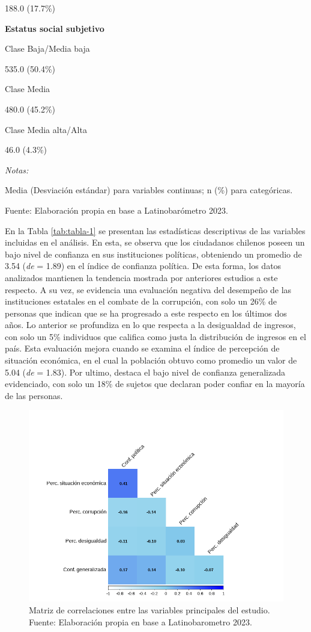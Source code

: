 \documentclass[12pt,twoside]{templates/facsothesis}
\begin{document}
188.0 (17.7\%)

\textbf{Estatus social subjetivo}

Clase Baja/Media baja

535.0 (50.4\%)

Clase Media

480.0 (45.2\%)

Clase Media alta/Alta

46.0 (4.3\%)

{\emph{Notas:}}

Media (Desviación estándar) para variables continuas; n (\%) para categóricas.

Fuente: Elaboración propia en base a Latinobarómetro 2023.

En la Tabla \ref{tab:tabla-1} se presentan las estadísticas descriptivas de las variables incluidas en el análisis. En esta, se observa que los ciudadanos chilenos poseen un bajo nivel de confianza en sus instituciones políticas, obteniendo un promedio de 3.54 (\emph{de} = 1.89) en el índice de confianza política. De esta forma, los datos analizados mantienen la tendencia mostrada por anteriores estudios a este respecto. A su vez, se evidencia una evaluación negativa del desempeño de las instituciones estatales en el combate de la corrupción, con solo un 26\% de personas que indican que se ha progresado a este respecto en los últimos dos años. Lo anterior se profundiza en lo que respecta a la desigualdad de ingresos, con solo un 5\% individuos que califica como justa la distribución de ingresos en el país. Esta evaluación mejora cuando se examina el índice de percepción de situación económica, en el cual la población obtuvo como promedio un valor de 5.04 (\emph{de} = 1.83). Por ultimo, destaca el bajo nivel de confianza generalizada evidenciado, con solo un 18\% de sujetos que declaran poder confiar en la mayoría de las personas.

\begin{figure}[!ht]

{\centering \includegraphics[width=1\linewidth,]{IPO/output/graphs/corrplot} 

}

\caption{Matriz de correlaciones entre las variables principales del estudio. Fuente: Elaboración propia en base a Latinobarometro 2023.}\label{fig:grafico-2}
\end{figure}
\end{document}
